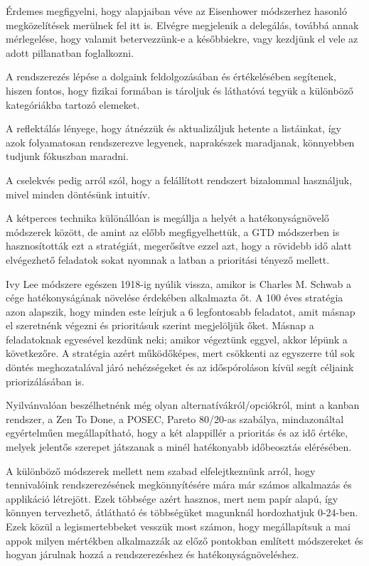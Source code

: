 Érdemes megfigyelni, hogy alapjaiban véve az Eisenhower módszerhez hasonló megközelítések merülnek fel itt is. Elvégre megjelenik a delegálás, továbbá annak mérlegelése, hogy valamit betervezzünk-e a későbbiekre, vagy kezdjünk el vele az adott pillanatban foglalkozni.

A rendszerezés lépése a dolgaink feldolgozásában és értékelésében segítenek, hiszen fontos, hogy fizikai formában is tároljuk és láthatóvá tegyük a különböző kategóriákba tartozó elemeket.

A reflektálás lényege, hogy átnézzük és aktualizáljuk hetente a listáinkat, így azok folyamatosan rendszerezve legyenek, naprakészek maradjanak, könnyebben tudjunk fókuszban maradni.

A cselekvés pedig arról szól, hogy a felállított rendszert bizalommal használjuk, mivel minden döntésünk intuitív.\cite{gtd}


A kétperces technika különállóan is megállja a helyét a hatékonyságnövelő módszerek között, de amint az előbb megfigyelhettük, a GTD módszerben is hasznosították ezt a stratégiát, megerősítve ezzel azt, hogy a rövidebb idő alatt elvégezhető feladatok sokat nyomnak a latban a prioritási tényező mellett.


Ivy Lee módszere egészen 1918-ig nyúlik vissza, amikor is Charles M. Schwab a cége hatékonyságának növelése érdekében alkalmazta őt. A 100 éves stratégia azon alapszik, hogy minden este leírjuk a 6 legfontosabb feladatot, amit másnap el szeretnénk végezni és prioritásuk szerint megjelöljük őket. Másnap a feladatoknak egyesével kezdünk neki; amikor végeztünk eggyel, akkor lépünk a következőre. A stratégia azért működőképes, mert csökkenti az egyszerre túl sok döntés meghozatalával járó nehézségeket és az időspóroláson kívül segít céljaink priorizálásában is.\cite{ivylee}

Nyilvánvalóan beszélhetnénk még olyan alternatívákról/opciókról, mint a kanban rendszer, a Zen To Done, a POSEC, Pareto 80/20-as szabálya, mindazonáltal egyértelműen megállapítható, hogy a két alappillér a prioritás és az idő értéke, melyek jelentős szerepet játszanak a minél hatékonyabb időbeosztás elérésében.


A különböző módszerek mellett nem szabad elfelejtkeznünk arról, hogy tennivalóink rendszerezésének megkönnyítésére mára már számos alkalmazás és applikáció létrejött. Ezek többsége azért hasznos, mert nem papír alapú, így könnyen tervezhető, átlátható és többségüket magunknál hordozhatjuk 0-24-ben. Ezek közül a legismertebbeket vesszük most számon, hogy megállapítsuk a mai appok milyen mértékben alkalmazzák az előző pontokban említett módszereket és hogyan járulnak hozzá a rendszerezéshez és hatékonyságnöveléshez.

